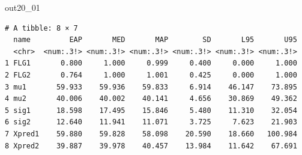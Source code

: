 \begin{MCMCout}{}{out20_01}
	\begin{verbatim}
# A tibble: 8 × 7
  name         EAP       MED       MAP        SD       L95       U95
  <chr>  <num:.3!> <num:.3!> <num:.3!> <num:.3!> <num:.3!> <num:.3!>
1 FLG1       0.800     1.000     0.999     0.400     0.000     1.000
2 FLG2       0.764     1.000     1.001     0.425     0.000     1.000
3 mu1       59.933    59.936    59.833     6.914    46.147    73.895
4 mu2       40.006    40.002    40.141     4.656    30.869    49.362
5 sig1      18.598    17.495    15.846     5.480    11.310    32.054
6 sig2      12.640    11.941    11.071     3.725     7.623    21.903
7 Xpred1    59.880    59.828    58.098    20.590    18.660   100.984
8 Xpred2    39.887    39.978    40.457    13.984    11.642    67.691
\end{verbatim}
\end{MCMCout}
